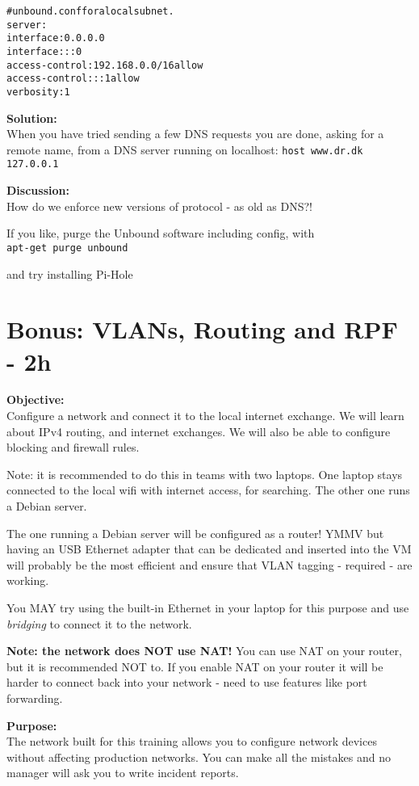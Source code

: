 \documentclass[a4paper,11pt,notitlepage]{report}
\begin{document}
\begin{alltt}\footnotesize
  # unbound.conf for a local subnet.
  server:
      interface: 0.0.0.0
      interface: ::0
      access-control: 192.168.0.0/16 allow
      access-control: ::1 allow
      verbosity: 1
\end{alltt}

{\bf Solution:}\\
When you have tried sending a few DNS requests you are done,  asking for a remote name, from a DNS server running on localhost:
\verb+host www.dr.dk 127.0.0.1+

{\bf Discussion:}\\
How do we enforce new versions of protocol - as old as DNS?!

If you like, purge the Unbound software including config, with\\
\verb+apt-get purge unbound+

and try installing Pi-Hole 

\chapter{Bonus: VLANs, Routing and RPF - 2h}
\label{ex:vlans-routing-rpf}

{\bf Objective:}\\
Configure a network and connect it to the local internet exchange. We will learn about IPv4 routing, and internet exchanges. We will also be able to configure blocking and firewall rules.

Note: it is recommended to do this in teams with two laptops. One laptop stays connected to the local wifi with internet access, for searching. The other one runs a Debian server.

The one running a Debian server will be configured as a router! YMMV but having an USB Ethernet adapter that can be dedicated and inserted into the VM will probably be the most efficient and ensure that VLAN tagging - required - are working.

You MAY try using the built-in Ethernet in your laptop for this purpose and use \emph{bridging} to connect it to the network.

{\bf Note: the network does NOT use NAT!} You can use NAT on your router, but it is recommended NOT to. If you enable NAT on your router it will be harder to connect back into your network - need to use features like port forwarding.

{\bf Purpose:}\\
The network built for this training allows you to configure network devices without affecting production networks. You can make all the mistakes and no manager will ask you to write incident reports.
\end{document}
